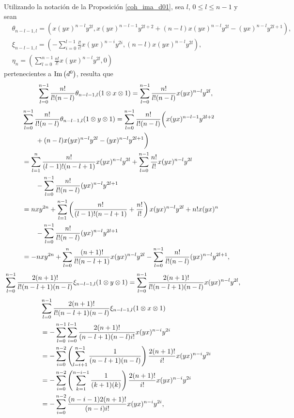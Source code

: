 \documentclass[fleqn,../tesis.tex]{subfiles}
\begin{document}
Utilizando la notación de la Proposición \ref{coh_ima_d01}, sea $l$, $0 \leq l \leq n - 1$ y sean
\begin{align*}
	&\theta_{n - l - 1, l} = \left(x(yx)^{n - l}y^{2l}, x(yx)^{n - l - 1}y^{2l + 2}
		 + (n - l)x(yx)^{n - l}y^{2l} -(yx)^{n - l}y^{2l + 1}\right),\\
	&\xi_{n - l - 1, l} = \left(-\sum_{i = 0}^{l - 1}\frac{l!}{i!}x(yx)^{n - i}y^{2i},
		(n - l)x(yx)^{n - l}y^{2l}\right),\\
	&\eta_n = \left(\sum_{l = 0}^{n - 1}\frac{n!}{l!}x(yx)^{n -l}y^{2l}, 0\right)
\end{align*}
pertenecientes a $\operatorname{Im}\left(d^{0}\right)$, resulta que
\begin{align*}
	\sum_{l = 0}^{n - 1}\frac{n!}{l!(n - l)}\theta_{n - l - 1, l}(1 \otimes x \otimes 1)
		= \sum_{l = 0}^{n - 1}\frac{n!}{l!(n - l)}x(yx)^{n - l}y^{2l},
\end{align*}
\begin{align*}
	&\sum_{l = 0}^{n - 1}\frac{n!}{l!(n - l)}\theta_{n - l - 1, l}(1 \otimes y \otimes 1)
		= \sum_{l = 0}^{n - 1}\frac{n!}{l!(n - l)}\bigg(x(yx)^{n - l - 1}y^{2l + 2}\\
	&\qquad+ (n - l)x(yx)^{n - l}y^{2l}-(yx)^{n - l}y^{2l + 1}\bigg)\\
	&= \sum_{l = 1}^{n}\frac{n!}{(l - 1)!(n - l + 1)}x(yx)^{n - l}y^{2l}
		 + \sum_{l = 0}^{n - 1}\frac{n!}{l!}x(yx)^{n - l}y^{2l}\\
	&\qquad -\sum_{l = 0}^{n - 1}\frac{n!}{l!(n - l)}(yx)^{n - l}y^{2l + 1}\\
	&= nxy^{2n} + \sum_{l = 1}^{n -1}\left(\frac{n!}{(l - 1)!(n - l + 1)}
		+ \frac{n!}{l!}\right)x(yx)^{n - l}y^{2l} + n!x(yx)^{n}\\
	&\qquad -\sum_{l = 0}^{n - 1}\frac{n!}{l!(n - l)}(yx)^{n - l}y^{2l + 1}\\
	&= -nxy^{2n} + \sum_{l = 0}^{n}\frac{(n + 1)!}{l!(n - l + 1)} x(yx)^{n - l}y^{2l}
		-\sum_{l = 0}^{n - 1}\frac{n!}{l!(n - l)}(yx)^{n - l}y^{2l + 1},
\end{align*}
\begin{align*}
	&\sum_{l = 0}^{n - 1}\frac{2(n + 1)!}{l!(n - l + 1)(n -l)}\xi_{n - l - 1, l}(1\otimes y\otimes 1)
		=\sum_{l = 0}^{n - 1}\frac{2(n + 1)!}{l!(n - l + 1)(n -l)}x(yx)^{n - l}y^{2l},
\end{align*}
\begin{align*}
	&\sum_{l = 0}^{n - 1}\frac{2(n + 1)!}{l!(n - l + 1)(n -l)}\xi_{n - l - 1, l}(1\otimes x\otimes 1)\\
	&=-\sum_{l = 0}^{n - 1}\sum_{i = 0}^{l-1}\frac{2(n + 1)!}{(n -l + 1)(n - l)i!}x(yx)^{n -i}y^{2i}\\
	&=-\sum_{i = 0}^{n - 2}\left(\sum_{l = i + 1}^{n - 1}\frac{1}{(n -l + 1)(n - l)}\right)
		\frac{2(n + 1)!}{i!}x(yx)^{n - i}y^{2i}\\
	&=-\sum_{i = 0}^{n - 2}\left(\sum_{k = 1}^{n - i- 1}\frac{1}{(k + 1)(k)}\right)
		\frac{2(n + 1)!}{i!}x(yx)^{n - i}y^{2i}\\
	&=-\sum_{i = 0}^{n - 2}\frac{(n - i - 1)2(n + 1)!}{(n - i)i!}x(yx)^{n - i}y^{2i},
\end{align*}
\end{document}
